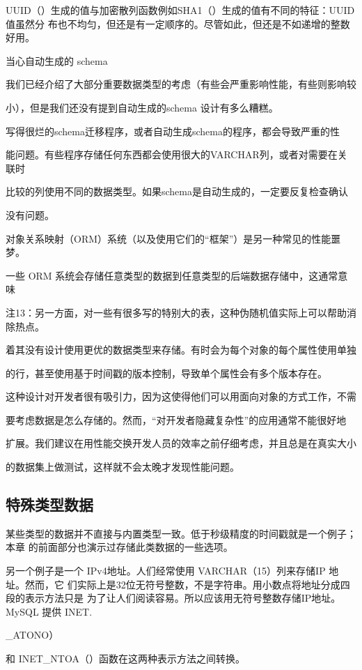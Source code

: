 UUID（）生成的值与加密散列函数例如SHA1（）生成的值有不同的特征：UUID 值虽然分
布也不均匀，但还是有一定顺序的。尽管如此，但还是不如递增的整数好用。

当心自动生成的 schema

我们已经介绍了大部分重要数据类型的考虑（有些会严重影响性能，有些则影响较

小），但是我们还没有提到自动生成的schema 设计有多么糟糕。

写得很烂的schema迁移程序，或者自动生成schema的程序，都会导致严重的性

能问题。有些程序存储任何东西都会使用很大的VARCHAR列，或者对需要在关联时

比较的列使用不同的数据类型。如果schema是自动生成的，一定要反复检查确认

没有问题。

对象关系映射（ORM）系统（以及使用它们的“框架”）是另一种常见的性能噩梦。

一些 ORM 系统会存储任意类型的数据到任意类型的后端数据存储中，这通常意味

注13：另一方面，对一些有很多写的特别大的表，这种伪随机值实际上可以帮助消除热点。

着其没有设计使用更优的数据类型来存储。有时会为每个对象的每个属性使用单独

的行，甚至使用基于时间戳的版本控制，导致单个属性会有多个版本存在。

这种设计对开发者很有吸引力，因为这使得他们可以用面向对象的方式工作，不需

要考虑数据是怎么存储的。然而，“对开发者隐藏复杂性”的应用通常不能很好地

扩展。我们建议在用性能交换开发人员的效率之前仔细考虑，并且总是在真实大小

的数据集上做测试，这样就不会太晚才发现性能问题。

\subsection{特殊类型数据}
某些类型的数据并不直接与内置类型一致。低于秒级精度的时间戳就是一个例子；本章
的前面部分也演示过存储此类数据的一些选项。

另一个例子是一个 IPv4地址。人们经常使用 VARCHAR（15）列来存储IP 地址。然而，它
们实际上是32位无符号整数，不是字符串。用小数点将地址分成四段的表示方法只是
为了让人们阅读容易。所以应该用无符号整数存储IP地址。MySQL 提供 INET.

\_ATONO）

和 INET\_NTOA（）函数在这两种表示方法之间转换。

